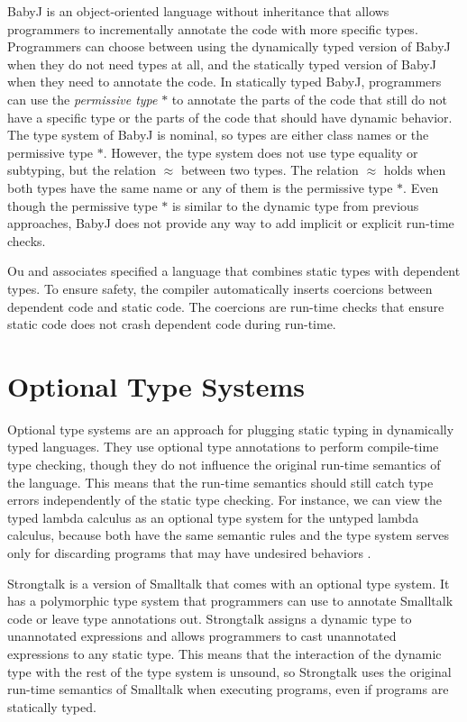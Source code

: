 BabyJ \cite{anderson2003babyj} is an object-oriented language
without inheritance that allows programmers to incrementally annotate
the code with more specific types.
Programmers can choose between using the dynamically typed version
of BabyJ when they do not need types at all, and the statically
typed version of BabyJ when they need to annotate the code.
In statically typed BabyJ, programmers can use the
\emph{permissive type} $*$ to annotate the parts of the code that
still do not have a specific type or the parts of the code that should
have dynamic behavior.
The type system of BabyJ is nominal, so types are either class names
or the permissive type $*$.
However, the type system does not use type equality or subtyping,
but the relation $\approx$ between two types.
The relation $\approx$ holds when both types have the same name or
any of them is the permissive type $*$.
Even though the permissive type $*$ is similar to the dynamic type
from previous approaches, BabyJ does not provide any way to add
implicit or explicit run-time checks.

Ou and associates \cite{ou2004dtd} specified a language that combines
static types with dependent types.
To ensure safety, the compiler automatically inserts coercions
between dependent code and static code.
The coercions are run-time checks that ensure static code does not
crash dependent code during run-time.

\section{Optional Type Systems}
\label{sec:optional}

Optional type systems \cite{bracha2004pluggable} are an approach for
plugging static typing in dynamically typed languages.
They use optional type annotations to perform compile-time type checking,
though they do not influence the original run-time semantics
of the language.
This means that the run-time semantics should still catch type errors
independently of the static type checking.
For instance, we can view the typed lambda calculus as an optional
type system for the untyped lambda calculus, because both have the
same semantic rules and the type system serves only for discarding
programs that may have undesired behaviors \cite{bracha2004pluggable}.

Strongtalk \cite{bracha1993strongtalk,bracha1996strongtalk} is
a version of Smalltalk that comes with an optional type system.
It has a polymorphic type system that programmers can use to annotate
Smalltalk code or leave type annotations out.
Strongtalk assigns a dynamic type to unannotated expressions and allows
programmers to cast unannotated expressions to any static type.
This means that the interaction of the dynamic type with the rest of
the type system is unsound, so Strongtalk uses the original run-time
semantics of Smalltalk when executing programs, even if programs are
statically typed.

